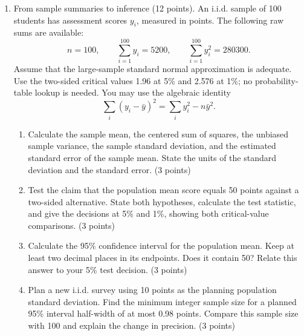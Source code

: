 \documentclass[a4paper,11pt,twoside]{article}
\begin{document}
\begin{enumerate}[label=\arabic*.,leftmargin=*,itemsep=5pt,topsep=4pt,parsep=0pt,start=9]
\Needspace{6.5cm}
\item From sample summaries to inference (12 points).
An i.i.d. sample of 100 students has assessment scores $y_i$, measured in
points. The following raw sums are available:
\[
n=100,\qquad \sum_{i=1}^{100}y_i=5200,\qquad
\sum_{i=1}^{100}y_i^2=280300.
\]
Assume that the large-sample standard normal approximation is adequate.
Use the two-sided critical values 1.96 at 5\% and 2.576 at 1\%; no
probability-table lookup is needed. You may use the algebraic identity
\[
\sum_i(y_i-\bar y)^2=\sum_i y_i^2-n\bar y^2.
\]
\begin{enumerate}[label=(\alph*),leftmargin=*,itemsep=2pt,topsep=2pt]
\item Calculate the sample mean, the centered sum of squares, the unbiased
sample variance, the sample standard deviation, and the estimated standard
error of the sample mean. State the units of the standard deviation and
the standard error. (3 points)
\item Test the claim that the population mean score equals 50 points against
a two-sided alternative. State both hypotheses, calculate the test statistic,
and give the decisions at 5\% and 1\%, showing both critical-value
comparisons. (3 points)
\item Calculate the 95\% confidence interval for the population mean.
Keep at least two decimal places in its endpoints. Does it contain 50?
Relate this answer to your 5\% test decision. (3 points)
\item Plan a new i.i.d. survey using 10 points as the planning population
standard deviation. Find the minimum integer sample size for a planned
95\% interval half-width of at most 0.98 points. Compare this sample size
with 100 and explain the change in precision. (3 points)
\end{enumerate}


\end{enumerate}
\end{document}
